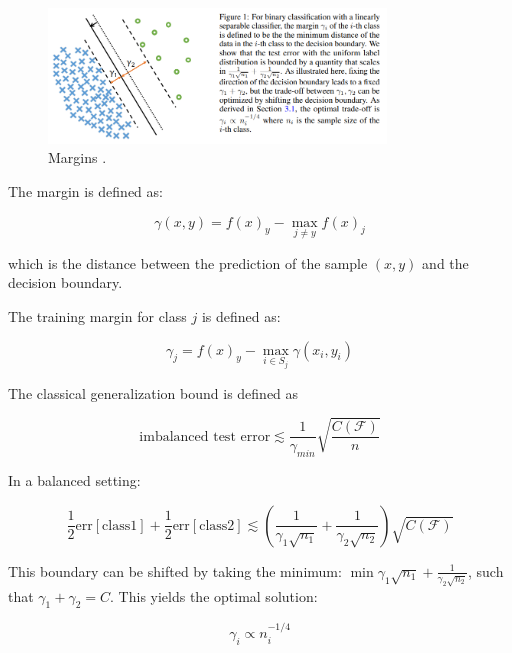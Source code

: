 \begin{figure}[ht]
    \centering
    \includegraphics[width=0.8\textwidth]{Images/decision_boundary.png} 
    \caption{Margins \cite{cao2019learningimbalanceddatasetslabeldistributionaware}. }
    \label{fig:decision_boundaries} 
\end{figure}

The margin is defined as:

\begin{equation}
    \label{eq:margin_def}
    \gamma(x,y) = f(x)_y - \max_{j \neq y}f(x)_j
\end{equation}

which is the distance between the prediction of the sample $(x,y)$ and the decision boundary.

The training margin for class $j$ is defined as:

\begin{equation}
    \label{eq:margin_class_def}
    \gamma_j = f(x)_y - \max_{i \in S_j}\gamma(x_i,y_i)
\end{equation}

The classical generalization bound is defined as

\begin{equation}
    \label{eq:gen_bound}
    \text{imbalanced test error}\lesssim \frac{1}{\gamma_{min}}\sqrt{\frac{C(\mathcal{F})}{n}}
\end{equation}

In a balanced setting:

\begin{equation}
    \frac{1}{2}\text{err}[\text{class1}]+\frac{1}{2}\text{err}[\text{class2}] \lesssim \left(\frac{1}{\gamma_1\sqrt{n_1}}+\frac{1}{\gamma_2\sqrt{n_2}}\right)\sqrt{C(\mathcal{F})}
\end{equation}

This boundary can be shifted by taking the minimum: $\min{\gamma_1\sqrt{n_1}}+\frac{1}{\gamma_2\sqrt{n_2}}$, such that $\gamma_1+\gamma_2=C$. This yields the optimal solution:

\begin{equation}
    \label{eq:opt_margin}
    \gamma_i\varpropto n^{-1/4}_i 
\end{equation}

